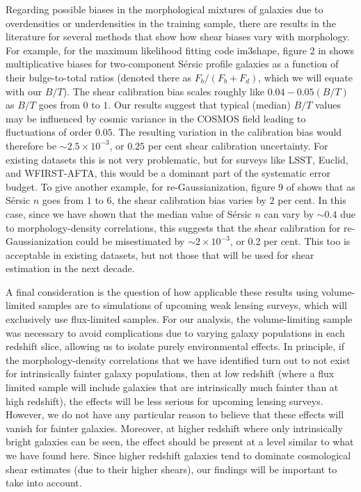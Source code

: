 \documentclass[twocolumn,useAMS,usenatbib]{mn2e}
\newcommand{\sersic}{S\'{e}rsic }
\begin{document}
Regarding possible biases in the morphological mixtures of galaxies
due to overdensities or underdensities in the training sample, there
are results in the literature for several methods that show how shear
biases vary with morphology.  For example, for the maximum likelihood
fitting code {\sc im3shape}, figure 2 in \cite{2012MNRAS.427.2711K}
shows multiplicative biases for two-component \sersic profile galaxies
as a function of their bulge-to-total ratios (denoted there as
$F_b/(F_b+F_d)$, which we will equate with our $B/T$).  The shear
calibration bias scales roughly like $0.04 - 0.05(B/T)$ as $B/T$ goes
from $0$ to $1$.  Our results suggest that typical (median) $B/T$
values may be influenced by cosmic variance in the COSMOS field
leading to fluctuations of order $0.05$.  The resulting variation in
the calibration bias would therefore be $\sim 2.5\times 10^{-3}$, or
$0.25$ per cent shear calibration uncertainty.  For existing datasets
this is not very problematic, but for surveys like LSST, Euclid, and
WFIRST-AFTA, this would be a dominant part of the systematic error
budget.  To give another example, for re-Gaussianization, figure 9 of
\cite{2012MNRAS.420.1518M} shows that as \sersic $n$ goes from $1$ to
$6$, the shear calibration bias varies by $2$ per cent.  In this case,
since we have shown that the median value of \sersic $n$ can vary by
$\sim 0.4$ due to morphology-density correlations, this suggests that
the shear calibration for re-Gaussianization could be misestimated by
$\sim 2\times 10^{-3}$, or 0.2 per cent.  This too is acceptable in
existing datasets, but not those that will be used for shear
estimation in the next decade.

A final consideration is the question of how applicable these results
using volume-limited samples are to simulations of upcoming weak
lensing surveys, which will exclusively use flux-limited samples.  For
our analysis, the volume-limiting sample was necessary to avoid
complications due to varying galaxy populations in each redshift
slice, allowing us to isolate purely environmental effects.  In
principle, if the morphology-density correlations that we have
identified turn out to not exist for intrinsically fainter galaxy
populations, then at low redshift (where a flux limited sample will
include galaxies that are intrinsically much fainter than at high
redshift), the effects will be less serious for upcoming lensing
surveys.  However, we do not have any particular reason to believe
that these effects will vanish for fainter galaxies.  Moreover, at
higher redshift where only intrinsically bright galaxies can be seen,
the effect should be present at a level similar to what we have found
here.  Since higher redshift galaxies tend to dominate cosmological
shear estimates (due to their higher shears), our findings will be
important to take into account.
\end{document}
